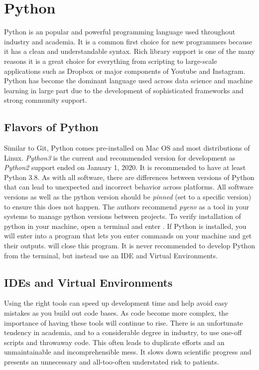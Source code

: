 \section{Python}

Python is an popular and powerful programming language used throughout industry and academia.
It is a common first choice for new programmers because it has a clean and understandable syntax.
Rich library support is one of the many reasons it is a great choice for everything from scripting to large-scale applications such as Dropbox or major components of Youtube and Instagram.
Python has become the dominant language used across data science and machine learning in large part due to the development of sophisticated frameworks and strong community support.

\subsection{Flavors of Python}

Similar to Git, Python comes pre-installed on Mac OS and most distributions of Linux.
\textit{Python3} is the current and recommended version for development as \textit{Python2} support ended on January 1, 2020.
It is recommended to have at least Python 3.8. As with all software, there are differences between versions of Python that can lead to unexpected and incorrect behavior across platforms.
All software versions as well as the python version should be \textit{pinned} (set to a specific version) to ensure this does not happen.
The authors recommend \textit{pyenv} as a tool in your systems to manage python versions between projects.
To verify installation of python in your machine, open a terminal and enter .
If Python is installed, you will enter into a program that lets you enter commands on your machine and get their outputs.  will close this program.
It is never recommended to develop Python from the terminal, but instead use an IDE and Virtual Environments.

\subsection{IDEs and Virtual Environments}

Using the right tools can speed up development time and help avoid easy mistakes as you build out code bases.
As code become more complex, the importance of having these tools will continue to rise.
There is an unfortunate tendency in academia, and to a considerable degree in industry, to use one-off scripts and throwaway code.
This often leads to duplicate efforts and an unmaintainable and incomprehensible mess. 
It slows down scientific progress and presents an unnecessary and all-too-often understated risk to patients.

